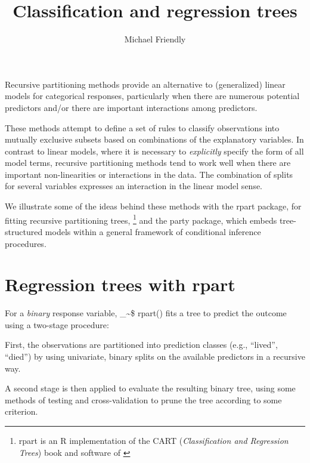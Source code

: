\documentclass{article}
\makeatletter
\newcommand\code{\bgroup\@makeother\_\@makeother\~\@makeother\$\@codex}
\def\@codex#1{{\normalfont\ttfamily\hyphenchar\font=-1 #1}\egroup}
\newcommand{\func}[1]{\code{#1()}}
\let\proglang=\textsf
\newcommand{\R}{\proglang{R}\xspace}
\newcommand{\pkg}[1]{\textsf{#1}\nocite{R-#1}}
\newcommand{\Rpackage}[1]{\pkg{#1} package}
\makeatother
\begin{document}



\title{Classification and regression trees}
\author{Michael Friendly}
\maketitle


Recursive partitioning methods provide an alternative to (generalized) linear
models for categorical responses, particularly when there are numerous
potential predictors and/or there are important interactions among predictors.

These methods attempt to define a set of rules to classify observations into
mutually exclusive subsets based on combinations of the explanatory variables.
In contrast to linear models, where it is necessary to \emph{explicitly}
specify the form of all model terms, recursive partitioning methods
tend to work well when there are important non-linearities or interactions
in the data.  The combination of splits for several  variables expresses
an interaction in the linear model sense.

We illustrate some of the ideas behind these methods with
the \Rpackage{rpart}, for fitting recursive partitioning trees,%
\footnote{\pkg{rpart} is an \R implementation of the CART
(\emph{Classification and Regression Trees})
book and software of \citet{Breiman-etal:1984}}
and the
\Rpackage{party}, which embeds tree-structured models within a general
framework of conditional inference procedures.  

\section{Regression trees with \pkg{rpart}}

For a \emph{binary} response variable, \func{rpart} fits a tree to predict the
outcome using a two-stage procedure:  
\begin{enumerate*}
  \item First, the observations are partitioned
into prediction classes (e.g., ``lived'', ``died'') by using univariate, binary splits
on the available predictors in a recursive way.  

  \item A second stage is then applied to evaluate the resulting binary tree, using some
methods of testing and cross-validation to prune the tree according to some
criterion.
\end{enumerate*}
\end{document}
